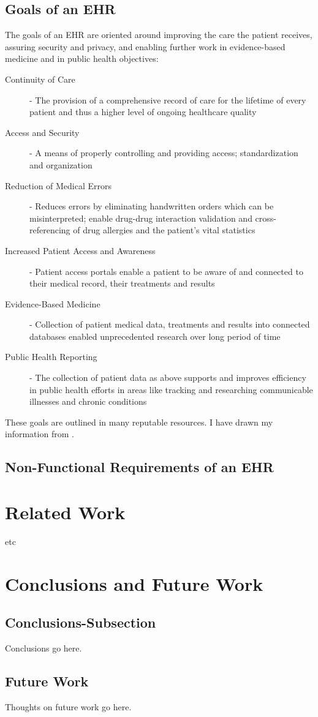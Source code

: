 \documentclass[10pt]{article}
\begin{document}
\subsection{Goals of an EHR}
\label{sec:Goals of an EHR}

The goals of an EHR are oriented around improving the care the patient receives, assuring security and privacy, and enabling further work in evidence-based medicine and in public health objectives: 
\begin{description}
\item[Continuity of Care] - The provision of a comprehensive record of care for the lifetime of every patient and thus a higher level of ongoing healthcare quality
\item[Access and Security] - A means of properly controlling and providing access; standardization and organization
\item[Reduction of Medical Errors] - Reduces errors by eliminating handwritten orders which can be misinterpreted; enable drug-drug interaction validation and cross-referencing of drug allergies and the patient's vital statistics
\item[Increased Patient Access and Awareness] - Patient access portals enable a patient to be aware of and connected to their medical record, their treatments and results
\item[Evidence-Based Medicine] - Collection of patient medical data, treatments and results into connected databases enabled unprecedented research over long period of time
\item[Public Health Reporting] - The collection of patient data as above supports and improves efficiency in public health efforts in areas like tracking and researching communicable illnesses and chronic conditions
\end{description}

These goals are outlined in many reputable resources. I have drawn my information from \cite{ehrbook}.

\subsection{Non-Functional Requirements of an EHR}
\label{sec:NFR of an EHR}

\section{Related Work}
\label{sec:Related}
etc

\section{Conclusions and Future Work}

\subsection{Conclusions-Subsection}
\label{sec:Conclusions-Subsection}

Conclusions go here. 

\subsection{Future Work}
\label{sec:Future Work}
Thoughts on future work go here.



\end{document}
